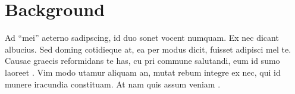 \section{Background}
\label{sec:bg}

Ad “mei” aeterno sadipscing, id duo sonet vocent numquam.
Ex nec dicant albucius. Sed doming cotidieque at, ea per modus dicit, fuisset adipisci mel te.
Causae graecis reformidans te has, cu pri commune salutandi, eum id sumo laoreet \cite{pms}.
Vim modo utamur aliquam an, mutat rebum integre ex nec, qui id munere iracundia constituam.
At nam quis assum veniam \cite{ng}.

